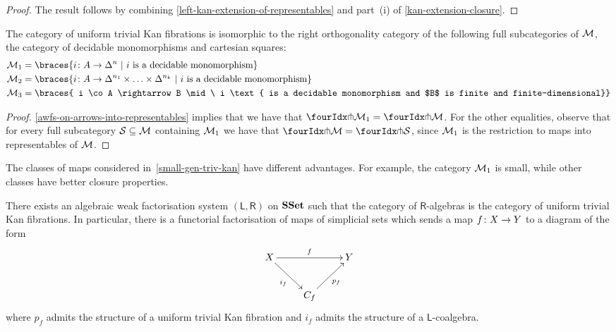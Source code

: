 \documentclass[reqno,10pt,a4paper,oneside]{amsart}
\begin{document}
\begin{proof} The result follows by combining \cref{left-kan-extension-of-representables} and part~(i) of \cref{kan-extension-closure}. 
\end{proof}


\begin{theorem} \label{small-gen-triv-kan}
The category of uniform trivial Kan fibrations is isomorphic to the right orthogonality 
category of the following full subcategories of $\cal{M}$, the category of decidable
monomorphisms and cartesian squares:
\begin{align*}
\cal{M}_1 & = \braces{i \co A \rightarrow \Delta^{n} \ | \ i \text{ is a  decidable monomorphism} } \\ 
\cal{M}_2  & = \braces{i \co A \rightarrow \Delta^{n_1} \times \ldots \times \Delta^{n_k} 
\ | \ i \text{ is a  decidable monomorphism} }  \\
\cal{M}_3  & = \braces{ i \co A \rightarrow B \mid \ i \text{ is a decidable monomorphism and 
$B$ is finite and finite-dimensional}} 
\end{align*}
\end{theorem}

\begin{proof}    \cref{awfs-on-arrows-into-representables} implies that we have that $\liftr{\cal{M}_1}  = \liftr{\cal{M}}$.
For the other equalities, observe that for every full subcategory $\cal{S} \subseteq \cal{M}$ containing $\cal{M}_1$ we have that $\liftr{\cal{M}} = \liftr{\cal{S}}$, since $\cal{M}_1$ is the restriction to maps into representables  of $\cal{M}$. 
\end{proof}

The classes of maps considered in~\cref{small-gen-triv-kan} have different advantages. For example, 
the category $\cal{M}_1$ is small, while other classes have better closure properties. 




\begin{proposition} There exists an algebraic weak factorisation system $(\mathsf{L}, \mathsf{R})$ on
$\SSet$ such that the category of $\mathsf{R}$-algebras is the category of uniform trivial Kan fibrations. 
In particular, there is a functorial factorisation of maps of simplicial sets which sends
a map $f \co X \to Y$ to a diagram of the form
\[
\xymatrix{ 
X \ar[rr]^f \ar[dr]_{i_f}  & & Y \\
 & C_f \ar[ur]_{p_f} }
 \]
 where $p_f$ admits the structure of  a uniform trivial Kan fibration and 
 $i_f$ admits the structure of a $\mathsf{L}$-coalgebra.
\end{proposition}
\end{document}
